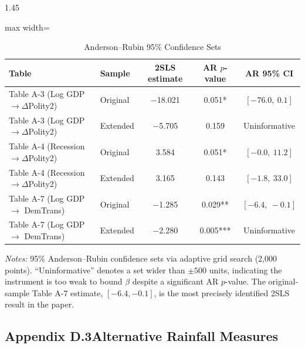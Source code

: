 \documentclass[12pt]{article}
\begin{document}
\begin{bibunit}[jpe]
\begin{spacing}{1.45}
\begin{table}[H]
\centering
\begin{adjustbox}{max width=\textwidth}
\begin{threeparttable}
\caption{Anderson--Rubin 95\% Confidence Sets}
\label{tab:D2}
\begin{tabular}{llccc}
\toprule
Table & Sample & 2SLS estimate & AR $p$-value & AR 95\% CI \\
\midrule
Table A-3 (Log GDP $\to\Delta$Polity2)  & Original & $-$18.021 & 0.051*  & $[-76.0,\ 0.1]$ \\
Table A-3 (Log GDP $\to\Delta$Polity2)  & Extended & $-$5.705  & 0.159   & Uninformative \\
Table A-4 (Recession $\to\Delta$Polity2) & Original & 3.584    & 0.051*  & $[-0.0,\ 11.2]$ \\
Table A-4 (Recession $\to\Delta$Polity2) & Extended & 3.165    & 0.143   & $[-1.8,\ 33.0]$ \\
Table A-7 (Log GDP $\to$ DemTrans)       & Original & $-$1.285 & 0.029** & $[-6.4,\ -0.1]$ \\
Table A-7 (Log GDP $\to$ DemTrans)       & Extended & $-$2.280 & 0.005*** & Uninformative \\
\bottomrule
\end{tabular}
\begin{tablenotes}[flushleft]
\footnotesize
\item \textit{Notes:} 95\% Anderson--Rubin \citep{andersonrubin1949} confidence sets via adaptive grid search (2,000 points). ``Uninformative'' denotes a set wider than $\pm500$ units, indicating the instrument is too weak to bound $\beta$ despite a significant AR $p$-value. The original-sample Table A-7 estimate, $[-6.4,-0.1]$, is the most precisely identified 2SLS result in the paper.
\end{tablenotes}
\end{threeparttable}
\end{adjustbox}
\end{table}

\subsection*{Appendix D.3\quad Alternative Rainfall Measures}


\end{spacing}
\end{bibunit}
\end{document}
